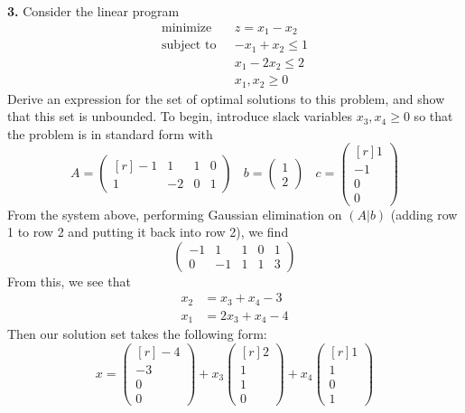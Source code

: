 \documentclass{article}
\begin{document}
\textbf{3.} Consider the linear program
\begin{align*}
    \text{minimize} \:\:\:\: &z = x_1 - x_2\\
    \text{subject to} \:\:\: &-x_1 + x_2 \leq 1\\
    &x_1 - 2x_2 \leq 2\\
    &x_1,x_2 \geq 0
\end{align*}
Derive an expression for the set of optimal solutions to this problem, and show that this set is unbounded.
\newline\newline
To begin, introduce slack variables $x_3,x_4 \geq 0$ so that the problem is in standard form with 
\[A = \begin{pmatrix*}[r]
    -1 & 1 & 1 & 0\\
    1 & -2 & 0 & 1
\end{pmatrix*}
\:\:\:\:
b = \begin{pmatrix}
    1\\
    2
\end{pmatrix}
\:\:\:\:
c = \begin{pmatrix*}[r]
    1\\
    -1\\
    0\\
    0
\end{pmatrix*}\]
From the system above, performing Gaussian elimination on $(A|b)$ (adding row 1 to row 2 and putting it back into row 2), we find
\[\left(\begin{array}{cccc|c}
    -1 & 1 & 1 & 0 & 1\\
    0 & -1 & 1 & 1 & 3
\end{array}\right)\]
From this, we see that 
\begin{align*}
    x_2 &= x_3 + x_4 - 3\\
    x_1 &= 2x_3 + x_4 - 4
\end{align*}
Then our solution set takes the following form:
\[x = \begin{pmatrix*}[r]
    -4\\
    -3\\
    0\\
    0
\end{pmatrix*} + x_3\begin{pmatrix*}[r]
    2\\
    1\\
    1\\
    0
\end{pmatrix*} + x_4\begin{pmatrix*}[r]
    1\\
    1\\
    0\\
    1
\end{pmatrix*}\]
\end{document}
